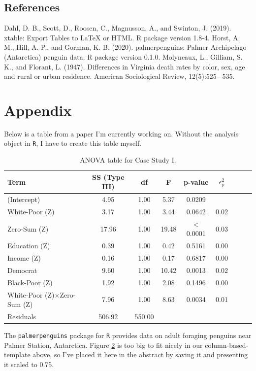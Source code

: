 \documentclass{article}\usepackage[]{graphicx}\usepackage[]{xcolor}
\begin{document}
\begin{multicols}{2}
\section*{References}

Dahl, D. B., Scott, D., Roosen, C., Magnusson, A., and Swinton, J. (2019). xtable: Export
Tables to LaTeX or HTML. R package version 1.8-4.
Horst, A. M., Hill, A. P., and Gorman, K. B. (2020). palmerpenguins: Palmer Archipelago
(Antarctica) penguin data. R package version 0.1.0.
Molyneaux, L., Gilliam, S. K., and Florant, L. (1947). Differences in Virginia death rates
by color, sex, age and rural or urban residence. American Sociological Review, 12(5):525–
535.

\pagebreak
\end{multicols}
\section{Appendix}
Below is a table from a paper I'm currently working on. Without the analysis object in \texttt{R}, I have to create this table myself.

\begin{table}[H]
\begin{center}
\begin{tabular}{l cc cc cc cc}\hline
Term & SS (Type III) & df & F & p-value & $\epsilon_{p}^{2}$ \\\hline
(Intercept)  & 4.95 & 1.00 & 5.37 & 0.0209\\
White-Poor (Z) & 3.17 & 1.00 & 3.44 & 0.0642 & 0.02\\
Zero-Sum (Z) & 17.96 & 1.00 & 19.48 & $<$0.0001 & 0.03 \\
Education (Z) & 0.39 & 1.00 & 0.42 & 0.5161 & 0.00\\
Income (Z) & 0.16 & 1.00 & 0.17 & 0.6817 & 0.00\\
Democrat & 9.60 & 1.00 & 10.42 & 0.0013 & 0.02\\
Black-Poor (Z) & 1.92 & 1.00 & 2.08 & 0.1496 & 0.00\\
White-Poor (Z)$\times$Zero-Sum (Z) & 7.96 & 1.00 & 8.63 & 0.0034 & 0.01\\
Residuals & 506.92 & 550.00 \\\hline
\end{tabular} \label{full.sleep.tab}
\caption{ANOVA table for Case Study I.}
\end{center}
\end{table}
The \texttt{palmerpenguins} package for \texttt{R} \cite{horst2022palmer} provides data on adult foraging penguins near Palmer Station,
Antarctica. Figure \href{"penguins.pdf"} 2 is too big to fit nicely in our column-based-template above, so I’ve placed it here in the abstract by saving it and presenting it scaled to 0.75.
\end{document}
